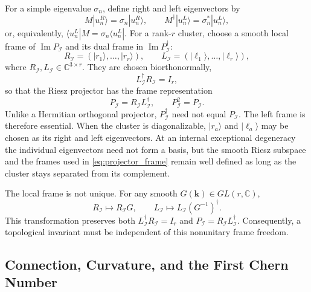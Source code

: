 \documentclass[11pt]{article}
\numberwithin{equation}{section}
\begin{document}
For a simple eigenvalue $\sigma_n$, define right and left eigenvectors by
\begin{equation}
  M|u_n^R\rangle=\sigma_n|u_n^R\rangle,
  \qquad
  M^\dagger|u_n^L\rangle=\sigma_n^*|u_n^L\rangle,
  \label{eq:left_right_eigenvectors}
\end{equation}
or, equivalently,
$\langle u_n^L|M=\sigma_n\langle u_n^L|$. For a rank-$r$ cluster, choose a
smooth local frame of $\operatorname{Im}P_{\mathcal I}$ and its dual frame
in $\operatorname{Im}P_{\mathcal I}^\dagger$:
\begin{equation}
  R_{\mathcal I}=
  (|r_1\rangle,\ldots,|r_r\rangle),
  \qquad
  L_{\mathcal I}=
  (|\ell_1\rangle,\ldots,|\ell_r\rangle),
\end{equation}
where $R_{\mathcal I},L_{\mathcal I}\in\mathbb C^{3\times r}$. They are
chosen biorthonormally,
\begin{equation}
  L_{\mathcal I}^\dagger R_{\mathcal I}=I_r,
  \label{eq:biorthonormal_frame}
\end{equation}
so that the Riesz projector has the frame representation
\begin{equation}
  P_{\mathcal I}=R_{\mathcal I}L_{\mathcal I}^\dagger,
  \qquad
  P_{\mathcal I}^2=P_{\mathcal I}.
  \label{eq:projector_frame}
\end{equation}
Unlike a Hermitian orthogonal projector, $P_{\mathcal I}^\dagger$ need not
equal $P_{\mathcal I}$. The left frame is therefore essential. When the
cluster is diagonalizable, $|r_a\rangle$ and $|\ell_a\rangle$ may be
chosen as its right and left eigenvectors. At an internal exceptional
degeneracy the individual eigenvectors need not form a basis, but the
smooth Riesz subspace and the frames used in
\eqref{eq:projector_frame} remain well defined as long as the cluster stays
separated from its complement.

The local frame is not unique. For any smooth
$G(\mathbf k)\in GL(r,\mathbb C)$,
\begin{equation}
  R_{\mathcal I}\mapsto R_{\mathcal I}G,
  \qquad
  L_{\mathcal I}\mapsto
  L_{\mathcal I}(G^{-1})^\dagger .
  \label{eq:frame_gauge_transformation}
\end{equation}
This transformation preserves both
$L_{\mathcal I}^\dagger R_{\mathcal I}=I_r$ and
$P_{\mathcal I}=R_{\mathcal I}L_{\mathcal I}^\dagger$. Consequently, a
topological invariant must be independent of this nonunitary frame
freedom.

\subsection{Connection, Curvature, and the First Chern Number}
\end{document}
